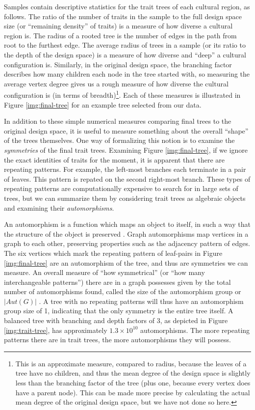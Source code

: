 \documentclass[graybox,natbib]{svmult}
\begin{document}
Samples contain descriptive statistics for the trait trees of each
cultural region, as follows. The ratio of the number of traits in the
sample to the full design space size (or ``remaining density'' of
traits) is a measure of how diverse a cultural region is. The radius of
a rooted tree is the number of edges in the path from root to the
furthest edge. The average radius of trees in a sample (or its ratio to
the depth of the design space) is a measure of how diverse and ``deep''
a cultural configuration is. Similarly, in the original design space,
the branching factor describes how many children each node in the tree
started with, so measuring the average vertex degree gives us a rough
measure of how diverse the cultural configuration is (in terms of
breadth)\footnote{This is an approximate measure, compared to radius,
  because the leaves of a tree have no children, and thus the mean
  degree of the design space is slightly less than the branching factor
  of the tree (plus one, because every vertex does have a parent node).
  This can be made more precise by calculating the actual mean degree of
  the original design space, but we have not done so here.}. Each of
these measures is illustrated in Figure \ref{img:final-tree} for an
example tree selected from our data.

In addition to these simple numerical measures comparing final trees to
the original design space, it is useful to measure something about the
overall ``shape'' of the trees themselves. One way of formalizing this
notion is to examine the \emph{symmetries} of the final trait trees.
Examining Figure \ref{img:final-tree}, if we ignore the exact identities
of traits for the moment, it is apparent that there are repeating
patterns. For example, the left-most branches each terminate in a pair
of leaves. This pattern is repated on the second right-most branch.
These types of repeating patterns are computationally expensive to
search for in large sets of trees, but we can summarize them by
considering trait trees as algebraic objects and examining their
\emph{automorphisms}.

An automorphism is a function which maps an object to itself, in such a
way that the structure of the object is preserved
\citep{rotman1995introduction}. Graph automorphisms map vertices in a
graph to each other, preserving properties such as the adjacency pattern
of edges. The six vertices which mark the repeating pattern of
leaf-pairs in Figure \ref{img:final-tree} are an automorphism of the
tree, and thus are symmetries we can measure. An overall measure of
``how symmetrical'' (or ``how many interchangeable patterns'') there are
in a graph possesses given by the total number of automorphisms found,
called the size of the automorphism group or $|\textit{Aut}(G)|$
\citep{godsil2001algebraic}. A tree with no repeating patterns will thus
have an automorphism group size of 1, indicating that the only symmetry
is the entire tree itself. A balanced tree with branching and depth
factors of 3, as depicted in Figure \ref{img:trait-tree}, has
approximately $1.3 \times 10^{10}$ automorphisms. The more repeating
patterns there are in trait trees, the more automorphisms they will
possess.
\end{document}
